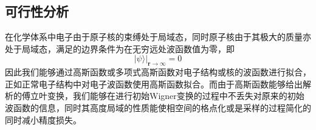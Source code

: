 

\subsection{可行性分析}
在化学体系中电子由于原子核的束缚处于局域态，同时原子核由于其极大的质量亦处于局域态，满足的边界条件为在无穷远处波函数值为零，即
\begin{equation}
	| \psi \rangle \big|_{\boldsymbol{r}\rightarrow \infty} = 0
\end{equation} 
因此我们能够通过高斯函数或多项式高斯函数对电子结构或核的波函数进行拟合，正如正常电子结构中对电子波函数使用高斯函数拟合。而由于高斯函数能够给出解析的傅立叶变换，我们能够在进行初始Wigner变换的过程中不丢失对原来的初始波函数的信息，同时其高度局域的性质能使相空间的格点化或是采样的过程简化的同时减小精度损失。

